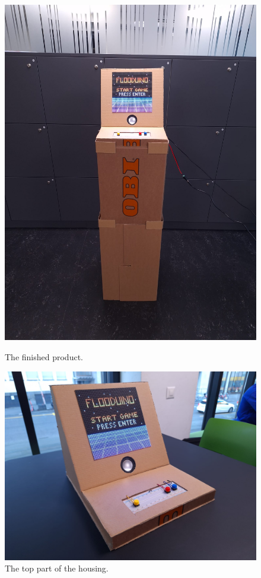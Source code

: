 \documentclass[10pt, a4paper]{article}
\begin{document}
\begin{figure}[h]
    \centering
    \begin{minipage}{0.48\linewidth}
    \centering
    \includegraphics[width=\linewidth]{Finished_Product.jpg}
    \caption{The finished product.}
    \end{minipage}
    \hfill
    \begin{minipage}{0.48\linewidth}
    \includegraphics[width=\linewidth]{top_part.jpg}
    \caption{The top part of the housing.}
    \end{minipage}
\end{figure}
\end{document}
